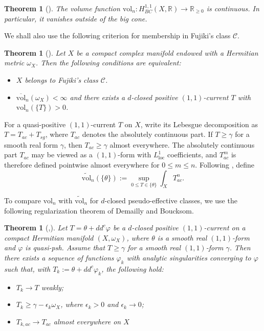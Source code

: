 \documentclass[11pt,letterpaper]{amsart}
\numberwithin{equation}{section}
\DeclareMathOperator{\vol}{vol}
\newtheorem{theo}[prop]{Theorem}
\def\beq{\begin{equation}}
\def\eeq{\end{equation}}
\def\vol{\text{vol}}
\begin{document}
\begin{theo}[{\cite[Theorem 3.20]{BGL}}]\label{vanishing-vol}
The volume function $\mathrm{vol}_n:\allowbreak H^{1,1}_{BC}(X,\mathbb{R}) \to \mathbb{R}_{\ge0}$ is continuous. In
particular, it vanishes outside of the big cone.
\end{theo}

We shall also use the following criterion for membership in Fujiki's class $\mathcal C$.
\begin{theo}[{\cite[Theorem C]{BGL}}]\label{cri}
Let $X$ be a compact complex manifold endowed with a Hermitian metric $\omega_X$. Then the following conditions are equivalent:
\begin{itemize}
\item $X$ belongs to Fujiki's class $\mathcal C$.
\item $\overline{\mathrm{vol}}_n(\omega_X)<\infty$ and there exists a $d$-closed positive $(1,1)$-current $T$ with
 $\mathrm{vol}_n(\{T\})>0$.
\end{itemize}
\end{theo}


For a quasi-positive $(1,1)$-current $T$ on $X$, write its Lebesgue decomposition as $T=T_{ac}+T_{sg}$, where $T_{ac}$ denotes the absolutely continuous part. If $T\ge\gamma$ for a smooth real form $\gamma$, then $T_{ac}\ge\gamma$ almost everywhere. The absolutely continuous part $T_{ac}$ may be viewed as a $(1,1)$-form with $L^1_{\mathrm{loc}}$ coefficients, and $T_{ac}^m$ is therefore defined pointwise almost everywhere for $0\le m\le n$. Following \cite[Definition 1.3]{Bou}, define
\beq
\widetilde{\vol}_n(\{\theta\}):=\sup_{0\le T\in \{\theta\}}\int_XT_{ac}^n.\nonumber
\eeq

To compare $\vol_n$ with $\widetilde{\vol}_n$ for $d$-closed pseudo-effective classes, we use the following regularization theorem of Demailly and Boucksom.


\begin{theo}[{\cite[Proposition 3.7]{Dem92},\cite[Theorem 2.4]{Bou}}]\label{regularization}
Let $T=\theta+dd^c\varphi$ be a $d$-closed positive $(1,1)$-current on a compact Hermitian manifold $(X,\omega_X)$, where $\theta$ is a smooth real $(1,1)$-form and $\varphi$ is quasi-psh. Assume that $T\ge\gamma$ for a smooth real $(1,1)$-form $\gamma$. Then there exists a sequence of functions $\varphi_k$ with analytic singularities converging to $\varphi$ such that, with $T_k:=\theta+dd^c\varphi_k$, the following hold:
\begin{itemize}
\item $T_k\to T$ weakly;
\item $T_k\ge\gamma-\epsilon_k\omega_X$, where $\epsilon_k>0$ and $\epsilon_k\to0$;
\item $T_{k,ac}\to T_{ac}$ almost everywhere on $X$
\end{itemize}
\end{theo}
\end{document}
